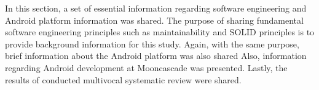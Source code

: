 In this section, a set of essential information regarding software engineering and Android platform information was shared. The purpose of sharing fundamental software engineering principles such as maintainability and SOLID principles is to provide background information for this study. Again, with the same purpose, brief information about the Android platform was also shared Also, information regarding Android development at Mooncascade was presented. Lastly, the results of conducted multivocal systematic review were shared.